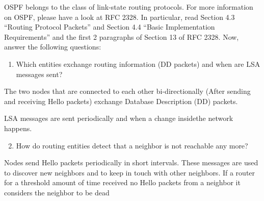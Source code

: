 
OSPF belongs to the class of link-state routing protocols. For more information on OSPF, please
have a look at RFC 2328. In particular, read Section 4.3 “Routing Protocol Packets” and Section
4.4 “Basic Implementation Requirements” and the first 2 paragraphs of Section 13 of RFC 2328.
Now, answer the following questions:

\begin{enumerate}
    \item
    Which entities exchange routing information (DD packets) and when are LSA messages sent?

\end{enumerate}
\begin{tcolorbox}
    \mysolution{}
    The two nodes that are connected to each other bi-directionally (After sending and receiving
    Hello packets) exchange Database Description (DD) packets. 

    LSA messages are sent periodically and when a change insidethe network happens. 
\end{tcolorbox}

\begin{enumerate}
    \setcounter{enumi}{1}
    \item
    How do routing entities detect that a neighbor is not reachable any more? 

\end{enumerate}
\begin{tcolorbox}
    \mysolution{}
    Nodes send Hello packets periodically in short intervals. These messages are used
    to discover new neighbors and to keep in touch with other neighbors. If a router 
    for a threshold amount of time received no Hello packets from a neighbor it considers 
    the neighbor to be dead

\end{tcolorbox}

